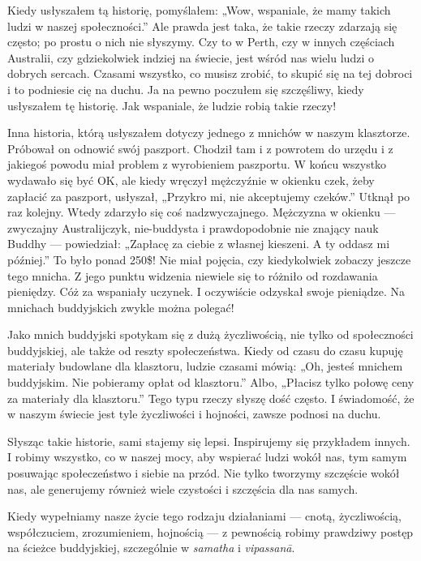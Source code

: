 \documentclass[12pt,openany]{book}
\begin{document}
Kiedy usłyszałem tą historię, pomyślałem: „Wow, wspaniale, że mamy takich ludzi w naszej społeczności.” Ale prawda jest taka, że takie rzeczy zdarzają się często; po prostu o nich nie słyszymy. Czy to w Perth, czy w innych częściach Australii, czy gdziekolwiek indziej na świecie, jest wśród nas wielu ludzi o dobrych sercach. Czasami wszystko, co musisz zrobić, to skupić się na tej dobroci i to podniesie cię na duchu. Ja na pewno poczułem się szczęśliwy, kiedy usłyszałem tę historię. Jak wspaniale, że ludzie robią takie rzeczy!

Inna historia, którą usłyszałem dotyczy jednego z mnichów w naszym klasztorze. Próbował on odnowić swój paszport. Chodził tam i z powrotem do urzędu i z jakiegoś powodu miał problem z wyrobieniem paszportu. W końcu wszystko wydawało się być OK, ale kiedy wręczył mężczyźnie w okienku czek, żeby zapłacić za paszport, usłyszał, „Przykro mi, nie akceptujemy czeków.” Utknął po raz kolejny. Wtedy zdarzyło się coś nadzwyczajnego. Mężczyzna w okienku --- zwyczajny Australijczyk, nie-buddysta i prawdopodobnie nie znający nauk Buddhy --- powiedział: „Zapłacę za ciebie z własnej kieszeni. A ty oddasz mi później.” To było ponad 250\$! Nie miał pojęcia, czy kiedykolwiek zobaczy jeszcze tego mnicha. Z jego punktu widzenia niewiele się to różniło od rozdawania pieniędzy. Cóż za wspaniały uczynek. I oczywiście odzyskał swoje pieniądze. Na mnichach buddyjskich zwykle można polegać!

Jako mnich buddyjski spotykam się z dużą życzliwością, nie tylko od społeczności buddyjskiej, ale także od reszty społeczeństwa. Kiedy od czasu do czasu kupuję materiały budowlane dla klasztoru, ludzie czasami mówią: „Oh, jesteś mnichem buddyjskim. Nie pobieramy opłat od klasztoru.” Albo, „Płacisz tylko połowę ceny za materiały dla klasztoru.” Tego typu rzeczy słyszę dość często. I świadomość, że w naszym świecie jest tyle życzliwości i hojności, zawsze podnosi na duchu. 

Słysząc takie historie, sami stajemy się lepsi. Inspirujemy się przykładem innych. I robimy wszystko, co w naszej mocy, aby wspierać ludzi wokół nas, tym samym posuwając społeczeństwo i siebie na przód. Nie tylko tworzymy szczęście wokół nas, ale generujemy również wiele czystości i szczęścia dla nas samych.

Kiedy wypełniamy nasze życie tego rodzaju działaniami --- cnotą, życzliwością, współczuciem, zrozumieniem, hojnością --- z pewnością robimy prawdziwy postęp na ścieżce buddyjskiej, szczególnie w \textit{samatha} i \textit{vipassanā}.
\end{document}
